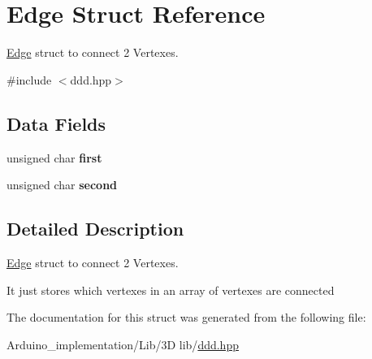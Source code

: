 \hypertarget{structEdge}{\section{Edge Struct Reference}
\label{structEdge}
}


\hyperlink{structEdge}{Edge} struct to connect 2 Vertexes.  




{\ttfamily \#include $<$ddd.\+hpp$>$}

\subsection*{Data Fields}
\begin{DoxyCompactItemize}
\item 
\hypertarget{structEdge_aa8bb6904062b00907e6cead680d1cde7}{unsigned char {\bfseries first}}\label{structEdge_aa8bb6904062b00907e6cead680d1cde7}

\item 
\hypertarget{structEdge_a2679f2ec0e44b6a72713ade9949a3381}{unsigned char {\bfseries second}}\label{structEdge_a2679f2ec0e44b6a72713ade9949a3381}

\end{DoxyCompactItemize}


\subsection{Detailed Description}
\hyperlink{structEdge}{Edge} struct to connect 2 Vertexes. 

It just stores which vertexes in an array of vertexes are connected 

The documentation for this struct was generated from the following file\+:\begin{DoxyCompactItemize}
\item 
Arduino\+\_\+implementation/\+Lib/3\+D lib/\hyperlink{ddd_8hpp}{ddd.\+hpp}\end{DoxyCompactItemize}
